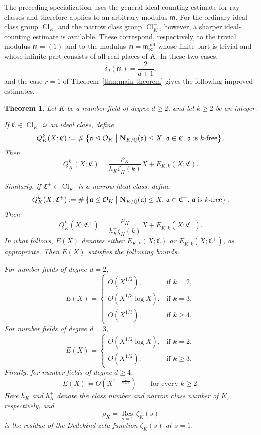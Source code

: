 \documentclass[11pt, reqno]{amsart}
\numberwithin{equation}{section}
\newtheorem{theorem}{Theorem}[section]
\newcommand{\suchthat}{\;\ifnum\currentgrouptype=16 \middle\fi|\;}
\newcommand{\Q}{\mathbb{Q}}
\newcommand{\Cl}{\operatorname{Cl}}
\newcommand{\Nrm}[2]{\mathbf{N}_{#1}(#2)}
\theoremstyle{definition}
\begin{document}
The preceding specialization uses the general ideal-counting estimate
for ray classes and therefore applies to an arbitrary modulus
$\mathfrak{m}$. For the ordinary ideal class group $\Cl_K$ and the
narrow class group $\Cl_K^+$, however, a sharper ideal-counting
estimate is available. These correspond, respectively, to the trivial
modulus $\mathfrak{m}=(1)$ and to the modulus
$\mathfrak{m}=\mathfrak{m}_{\infty}^{\mathrm{full}}$ whose finite part is trivial and
whose infinite part consists of all real places of $K$. In these two
cases,
\[
\delta_d(\mathfrak{m})=\frac{2}{d+1},
\]
and the case $r=1$ of Theorem~\ref{thm:main-theorem} gives the
following improved estimates.

\begin{theorem}\label{thm:k-free-ideals-class-and-narrow-class-groups}
Let $K$ be a number field of degree $d\geq2$, and let $k\geq2$ be an
integer.

If $\mathfrak{C}\in\Cl_K$ is an ideal class, define
\[
Q_K^k(X;\mathfrak{C})
:=
\#\left\{
\mathfrak{a}\trianglelefteq\mathcal{O}_K
\suchthat
\Nrm{K/\Q}{\mathfrak{a}}\leq X,\,
\mathfrak{a}\in\mathfrak{C},\,
\mathfrak{a}\text{ is $k$-free}
\right\}.
\]
Then
\[
Q_K^k(X;\mathfrak{C})
=
\frac{\rho_K}{h_K\zeta_K(k)}X
+
E_{K,k}(X;\mathfrak{C}).
\]

Similarly, if $\mathfrak{C}^+\in\Cl_K^+$ is a narrow ideal class,
define
\[
Q_K^k(X;\mathfrak{C}^+)
:=
\#\left\{
\mathfrak{a}\trianglelefteq\mathcal{O}_K
\suchthat
\Nrm{K/\Q}{\mathfrak{a}}\leq X,\,
\mathfrak{a}\in\mathfrak{C}^+,\,
\mathfrak{a}\text{ is $k$-free}
\right\}.
\]
Then
\[
Q_K^k(X;\mathfrak{C}^+)
=
\frac{\rho_K}{h_K^+\zeta_K(k)}X
+
E_{K,k}^+(X;\mathfrak{C}^+).
\]
In what follows, $E(X)$ denotes either $E_{K,k}(X;\mathfrak{C})$ or
$E_{K,k}^+(X;\mathfrak{C}^+)$, as appropriate. Then $E(X)$ satisfies the following bounds. 

\noindent For number fields of degree $d=2$,
\[
E(X)
=
\begin{cases}
O\left(X^{1/2}\right),
& \text{if } k=2,\\[6pt]
O\left(X^{1/3}\log X\right),
& \text{if } k=3,\\[6pt]
O\left(X^{1/3}\right),
& \text{if } k\geq4.
\end{cases}
\]
For number fields of degree $d=3$,
\[
E(X)
=
\begin{cases}
O\left(X^{1/2}\log X\right),
& \text{if } k=2,\\[6pt]
O\left(X^{1/2}\right),
& \text{if } k\geq3.
\end{cases}
\]
Finally, for number fields of degree $d\geq4$,
\[
E(X)
=
O\left(X^{1-\frac{2}{d+1}}\right)
\qquad
\text{for every }k\geq2.
\]
Here $h_K$ and $h_K^+$ denote the class number and narrow class number
of $K$, respectively, and
\[
\rho_K
=
\underset{s=1}{\operatorname{Res}}\,\zeta_K(s)
\]
is the residue of the Dedekind zeta function $\zeta_K(s)$ at $s=1$.
\end{theorem}
\end{document}
